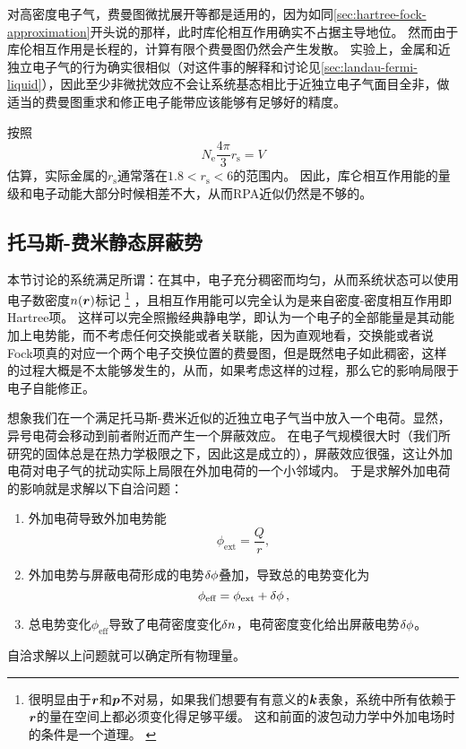 对高密度电子气，费曼图微扰展开等都是适用的，因为如同\autoref{sec:hartree-fock-approximation}开头说的那样，此时库伦相互作用确实不占据主导地位。
然而由于库伦相互作用是长程的，计算有限个费曼图仍然会产生发散。
实验上，金属和近独立电子气的行为确实很相似（对这件事的解释和讨论见\autoref{sec:landau-fermi-liquid}），因此至少非微扰效应不会让系统基态相比于近独立电子气面目全非，做适当的费曼图重求和修正电子能带应该能够有足够好的精度。

按照
\[
    N_\text{e} \frac{4\pi}{3} r_\text{s} = V
\]
估算，实际金属的$r_\text{s}$通常落在$1.8 < r_\text{s} < 6$的范围内。
因此，库仑相互作用能的量级和电子动能大部分时候相差不大，从而RPA近似仍然是不够的。

\subsection{托马斯-费米静态屏蔽势}\label{sec:ext-e}

本节讨论的系统满足所谓：在其中，电子充分稠密而均匀，从而系统状态可以使用电子数密度$n(\vb*{r})$标记%
\footnote{
    很明显由于$\vb*{r}$和$\vb*{p}$不对易，如果我们想要有有意义的$\vb*{k}$表象，系统中所有依赖于$\vb*{r}$的量在空间上都必须变化得足够平缓。
    这和前面的波包动力学中外加电场时的条件是一个道理。
    \label{note:smooth-electron-distribution}
}%
，且相互作用能可以完全认为是来自密度-密度相互作用即Hartree项。
这样可以完全照搬经典静电学，即认为一个电子的全部能量是其动能加上电势能，而不考虑任何交换能或者关联能，因为直观地看，交换能或者说Fock项真的对应一个两个电子交换位置的费曼图，但是既然电子如此稠密，这样的过程大概是不太能够发生的，从而，如果考虑这样的过程，那么它的影响局限于电子自能修正。

想象我们在一个满足托马斯-费米近似的近独立电子气当中放入一个电荷。显然，异号电荷会移动到前者附近而产生一个屏蔽效应。
在电子气规模很大时（我们所研究的固体总是在热力学极限之下，因此这是成立的），屏蔽效应很强，这让外加电荷对电子气的扰动实际上局限在外加电荷的一个小邻域内。
于是求解外加电荷的影响就是求解以下自洽问题：
\begin{enumerate}
    \item 外加电荷导致外加电势能
    \begin{equation}
        \phi_\text{ext} = \frac{Q}{r},
    \end{equation}
    \item 外加电势与屏蔽电荷形成的电势$\var{\phi}$叠加，导致总的电势变化为
    \begin{equation}
        \phi_\text{eff} = \phi_\text{ext} + \var{\phi},
    \end{equation}
    \item 总电势变化$\phi_\text{eff}$导致了电荷密度变化$\var{n}$，电荷密度变化给出屏蔽电势$\var{\phi}$。
\end{enumerate}
自洽求解以上问题就可以确定所有物理量。

